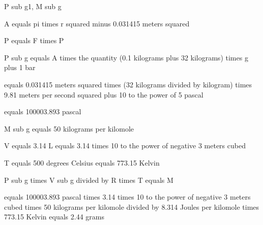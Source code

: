 P sub g1, M sub g

A equals pi times r squared minus 0.031415 meters squared

P equals F times P

P sub g equals A times the quantity (0.1 kilograms plus 32 kilograms) times g plus 1 bar

equals 0.031415 meters squared times (32 kilograms divided by kilogram) times 9.81 meters per second squared plus 10 to the power of 5 pascal

equals 100003.893 pascal

M sub g equals 50 kilograms per kilomole

V equals 3.14 L equals 3.14 times 10 to the power of negative 3 meters cubed

T equals 500 degrees Celsius equals 773.15 Kelvin

P sub g times V sub g divided by R times T equals M

equals 100003.893 pascal times 3.14 times 10 to the power of negative 3 meters cubed times 50 kilograms per kilomole divided by 8.314 Joules per kilomole times 773.15 Kelvin equals 2.44 grams